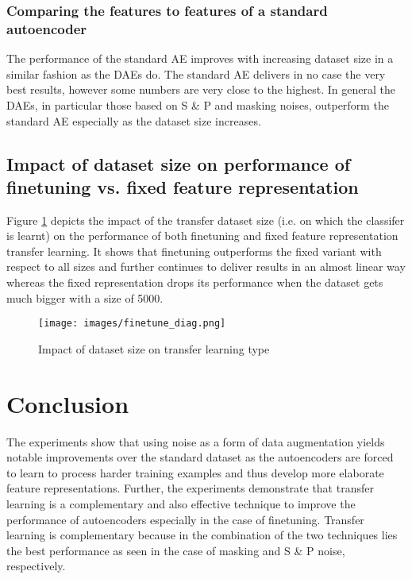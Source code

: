 \documentclass[10pt, a4paper]{article}
\begin{document}
	\subsubsection{Comparing the features to features of a standard autoencoder}
    The performance of the standard AE improves with increasing dataset size in a similar fashion as the DAEs do. The standard AE delivers in no case the very best results, however some numbers are very close to the highest. In general the DAEs, in particular those based on S \& P and masking noises, outperform the standard AE especially as the dataset size increases.
    
    \subsection{Impact of dataset size on performance of finetuning vs. fixed feature representation}
    Figure \ref{fig:diagfine} depicts the impact of the transfer dataset size (i.e. on which the classifer is learnt) on the performance of both finetuning and fixed feature representation transfer learning. It shows that finetuning outperforms the fixed variant with respect to all sizes and further continues to deliver results in an almost linear way whereas the fixed representation drops its performance when the dataset gets much bigger with a size of 5000. 
    
    \begin{figure}[h]
    \centering
    \texttt{[image: images/finetune\_diag.png]}
    \caption{Impact of dataset size on transfer learning type}
    \label{fig:diagfine}
    \end{figure}
	
	\section{Conclusion}
	The experiments show that using noise as a form of data augmentation yields notable improvements over the standard dataset as the autoencoders are forced to learn to process harder training examples and thus develop more elaborate feature representations. Further, the experiments demonstrate that transfer learning is a complementary and also effective technique to improve the performance of autoencoders especially in the case of finetuning. Transfer learning is complementary because in the combination of the two techniques lies the best performance as seen in the case of masking and S \& P noise, respectively.
	
\end{document}
